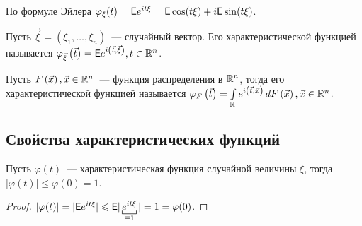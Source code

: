  По формуле Эйлера $\varphi_\xi(t) = \mathsf{E} e^{i t \xi} = \mathsf{E} \cos (t \xi) + i \mathsf{E} \sin(t \xi)$.
 
 \begin{definition}
 	Пусть $\vec \xi = ( \xi_1, \ldots, \xi_n)$~--- случайный вектор. Его характеристической функцией называется $\varphi_{\vec \xi} \left(\vec t \right) = \mathsf{E} e^{i \left( \vec t, \vec \xi \right)}, t \in \mathbb{R}^n$.
 \end{definition}
 \begin{definition}
 	Пусть $F \left( \vec x \right), \vec x \in \mathbb{R}^n$~--- функция распределения в $\mathbb{R}^n$, тогда его характеристической функцией называется $\varphi_F \left( \vec t \right) = \int\limits_{\mathbb{R}} e^{i \left( \vec t, \vec x \right)} \, d F \left( \vec x \right), \vec x \in \mathbb{R}^n$.
 \end{definition}
 \subsection{Свойства характеристических функций}
 \setcounter{property}{0}
 \begin{property}
 	Пусть $\varphi(t)$~--- характеристическая функция случайной величины $\xi$, тогда $| \varphi (t) | \leqslant \varphi(0) = 1$.
 	\begin{proof}
 		$| \varphi(t) | = | \E e^{i t \xi} | \leqslant \E | \underbracket[0.5pt]{e^{i t \xi}}_{\equiv 1} | = 1 = \varphi(0)$.
 	\end{proof}
 \end{property}
	 






































